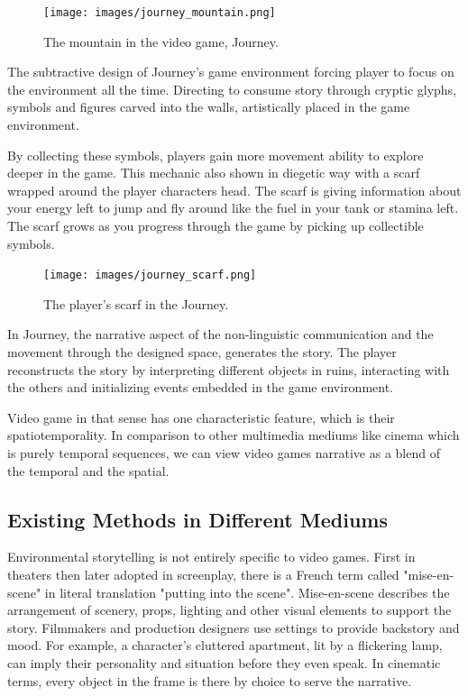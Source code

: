             \begin{figure}[H]
                \centering
                \texttt{[image: images/journey\_mountain.png]}
                \caption{The mountain in the video game, Journey.}
                \label{fig:JOURNEY_MOUNTAIN}
            \end{figure}

            The subtractive design of Journey's game environment forcing player to focus on the environment all the time. Directing to consume story through cryptic glyphs, symbols and figures carved into the walls, artistically placed in the game environment.\par

            By collecting these symbols, players gain more movement ability to explore deeper in the game. This mechanic also shown in diegetic way with a scarf wrapped around the player characters head. The scarf is giving information about your energy left to jump and fly around like the fuel in your tank or stamina left. The scarf grows as you progress through the game by picking up collectible symbols.\par

            \begin{figure}[H]
                \centering
                \texttt{[image: images/journey\_scarf.png]}
                \caption{The player's scarf in the Journey.}
                \label{fig:JOURNEY_SCARF}
            \end{figure}      

            In Journey, the narrative aspect of the non-linguistic communication and the movement through the designed space, generates the story. The player reconstructs the story by interpreting different objects in ruins, interacting with the others and initializing events embedded in the game environment.\par

            Video game in that sense has one characteristic feature, which is their spatiotemporality. In comparison to other multimedia mediums like cinema which is purely temporal sequences, we can view video games narrative as a blend of the temporal and the spatial\cite{Liminal_Space_Between_Embedded_and_Emergent_Narrative}.
            \subsection{Existing Methods in Different Mediums}
            Environmental storytelling is not entirely specific to video games. First in theaters then later adopted in screenplay, there is a French term called "mise-en-scene" in literal translation "putting into the scene". Mise-en-scene describes the arrangement of scenery, props, lighting and other visual elements to support the story. Filmmakers and production designers use settings to provide backstory and mood. For example, a character’s cluttered apartment, lit by a flickering lamp, can imply their personality and situation before they even speak. In cinematic terms, every object in the frame is there by choice to serve the narrative.\cite{Mise_en_scene}\par
        
